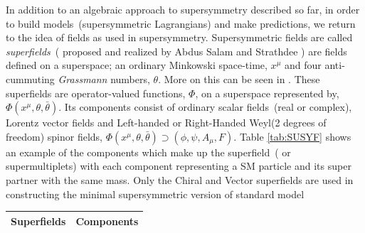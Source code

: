 In addition to an algebraic approach to supersymmetry described so far, in order to build models~(supersymmetric Lagrangians) and make predictions, we return to the idea of fields as used in supersymmetry. Supersymmetric fields are called \textit{superfields}~( proposed and realized by Abdus Salam and Strathdee \cite{SALAM}) are fields defined on a superspace; an ordinary Minkowski space-time, $x^{\mu}$ and four anti-cummuting \textit{Grassmann} numbers, $\theta$. More on this can be seen in  \cite{SM}.
These superfields are operator-valued functions, \textbf{$\Phi$}, on a superspace represented by, \textbf{$\Phi\left(x^{\mu},\theta,\bar{\theta}\right)$}.
Its components consist of ordinary scalar fields~(real or complex), Lorentz vector fields and Left-handed or Right-Handed Weyl(2 degrees of freedom) spinor fields, \textbf{$\Phi\left(x^{\mu},\theta,\bar{\theta}\right) \supset (\phi, \psi, A_{\mu}, F)$}.
Table \ref{tab:SUSYF} shows an example of the components which make up the  superfield~( or supermultiplets) with each component representing a SM particle and its super partner with the same mass. Only the Chiral and Vector  superfields are used in constructing the minimal supersymmetric version of standard model

\begin{center}
\centering
\begin{tabular}{c c}
\hline
\bfseries{Superfields} & \bfseries {Components}\\
\hline

\hline \hline
\end{tabular}
\label{tab:SUSYF} 
\end{center}

